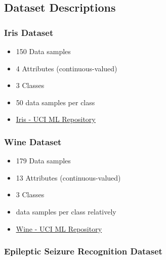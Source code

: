 \begin{flushleft}
    \subsection{Dataset Descriptions}
        \subsubsection{Iris Dataset}
            \begin{itemize}
                \item 150 Data samples
                \item 4 Attributes (continuous-valued)
                \item 3 Classes
                \item 50 data samples per class
                \item \href{https://archive.ics.uci.edu/ml/datasets/iris}{\underline{Iris - UCI ML Repository} }
            \end{itemize}
        \subsubsection{Wine Dataset}
            \begin{itemize}
                \item 179 Data samples
                \item 13 Attributes (continuous-valued)
                \item 3 Classes
                \item <59, 71, 48> data samples per class relatively
                \item \href{https://archive.ics.uci.edu/ml/datasets/wine}{\underline{Wine - UCI ML Repository} }
            \end{itemize}
        \subsubsection{Epileptic Seizure Recognition Dataset}


\end{flushleft}
